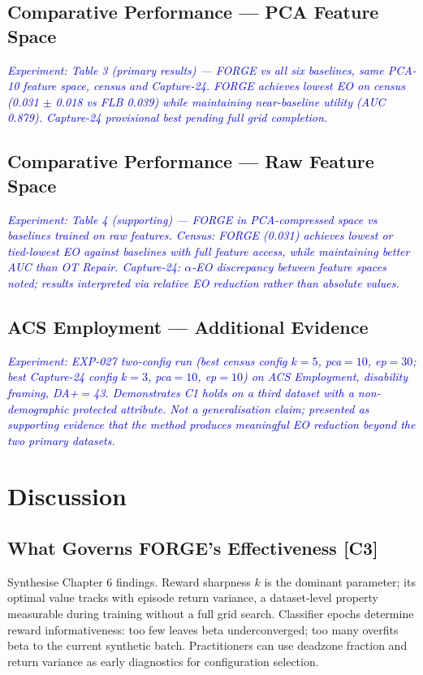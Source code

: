 \documentclass[12pt]{article}
\newcommand{\experiment}[1]{\textcolor{blue}{\textit{Experiment: #1}}}
\newcommand{\contrib}[1]{\textbf{[#1]}}
\begin{document}
\subsection{Comparative Performance --- PCA Feature Space}
\experiment{Table 3 (primary results) --- FORGE vs all six baselines, same
PCA-10 feature space, census and Capture-24. FORGE achieves lowest EO on
census (0.031 $\pm$ 0.018 vs FLB 0.039) while maintaining near-baseline
utility (AUC 0.879). Capture-24 provisional best pending full grid completion.}

\subsection{Comparative Performance --- Raw Feature Space}
\experiment{Table 4 (supporting) --- FORGE in PCA-compressed space vs
baselines trained on raw features. Census: FORGE (0.031) achieves lowest or
tied-lowest EO against baselines with full feature access, while maintaining
better AUC than OT Repair. Capture-24: $\alpha$-EO discrepancy between feature
spaces noted; results interpreted via relative EO reduction rather than
absolute values.}

\subsection{ACS Employment --- Additional Evidence}
\experiment{EXP-027 two-config run (best census config $k{=}5$, pca$=10$,
ep$=30$; best Capture-24 config $k{=}3$, pca$=10$, ep$=10$) on ACS
Employment, disability framing, DA+$=$43. Demonstrates C1 holds on a third
dataset with a non-demographic protected attribute. Not a generalisation claim;
presented as supporting evidence that the method produces meaningful EO
reduction beyond the two primary datasets.}

\section{Discussion}

\subsection{What Governs FORGE's Effectiveness \contrib{C3}}
Synthesise Chapter 6 findings. Reward sharpness $k$ is the dominant parameter;
its optimal value tracks with episode return variance, a dataset-level property
measurable during training without a full grid search. Classifier epochs
determine reward informativeness: too few leaves beta underconverged; too many
overfits beta to the current synthetic batch. Practitioners can use deadzone
fraction and return variance as early diagnostics for configuration selection.
\end{document}
